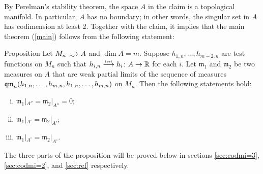 By Perelman's stability theorem, the space $A$ in the claim is a topological manifold.
In particular, $A$ has no boundary;
in other words, the singular set in $A$ has codimension at least 2.
Together with the claim, it implies that the main theorem (\ref{main}) follows from the following statement:

\begin{thm}{Proposition}\label{prop:3parts}
Let $M_n\smooths{} A$ and $\dim A=m$.
Suppose $h_{1,n},\dots, h_{m-2,n}$ are test functions on $M_n$ 
such that $h_{i,n}\zz\testto  h_i\:A\to \RR$ for each $i$.
Let $\mathfrak m_1$ and $\mathfrak m_2$ be two measures on $A$ that are weak partial limits of the sequence of measures $\qm_n( h_{1,n},\zz\dots,  h_{m,n}, h_{1,n},\zz\dots,  h_{m,n})$ on $M_n$.
Then the following statements hold:
\begin{enumerate}[(i)]
\item\label{prop:3parts:codim3} $\mathfrak m_1|_{A''}=\mathfrak m_2|_{A''}=0$;

\item\label{prop:3parts:codim2} $\mathfrak m_1|_{A'}=\mathfrak m_2|_{A'}$;

\item\label{prop:3parts:reg} $\mathfrak m_1|_{A^\circ}=\mathfrak m_2|_{A^\circ}$.
\end{enumerate}
\end{thm}

The three parts of the proposition will be proved below in sections \ref{sec:codmi=3}, \ref{sec:codmi=2}, and \ref{sec:ref} respectively.

